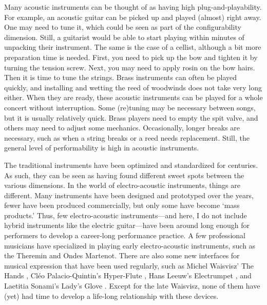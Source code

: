 Many acoustic instruments can be thought of as having high plug-and-playability. For example, an acoustic guitar can be picked up and played (almost) right away. One may need to tune it, which could be seen as part of the configurability dimension. Still, a guitarist would be able to start playing within minutes of unpacking their instrument. The same is the case of a cellist, although a bit more preparation time is needed. First, you need to pick up the bow and tighten it by turning the tension screw. Next, you may need to apply rosin on the bow hairs. Then it is time to tune the strings.
Brass instruments can often be played quickly, and installing and wetting the reed of woodwinds does not take very long either. When they are ready, these acoustic instruments can be played for a whole concert without interruption. Some (re)tuning may be necessary between songs, but it is usually relatively quick. Brass players need to empty the spit valve, and others may need to adjust some mechanics. Occasionally, longer breaks are necessary, such as when a string breaks or a reed needs replacement. Still, the general level of performability is high in acoustic instruments.

The traditional instruments have been optimized and standardized for centuries. As such, they can be seen as having found different sweet spots between the various dimensions. In the world of electro-acoustic instruments, things are different. Many instruments have been designed and prototyped over the years, fewer have been produced commercially, but only some have become `mass products.' Thus, few electro-acoustic instruments---and here, I do not include hybrid instruments like the electric guitar---have been around long enough for performers to develop a career-long performance practice. A few professional musicians have specialized in playing early electro-acoustic instruments, such as the Theremin and Ondes Martenot. There are also some new interfaces for musical expression that have been used regularly, such as Michel Waisvisz' The Hands \citep{waisvisz_hands_1985}, Cléo Palacio-Quintin's Hyper-Flute \citep{palacio-quintin_eight_2008}, Hans Leeuw's Electrumpet \citep{leeuw_electrumpet_2012}, and Laetitia Sonami's Lady's Glove \citep{NIME20_45}. Except for the late Waisvisz, none of them have (yet) had time to develop a life-long relationship with these devices.

